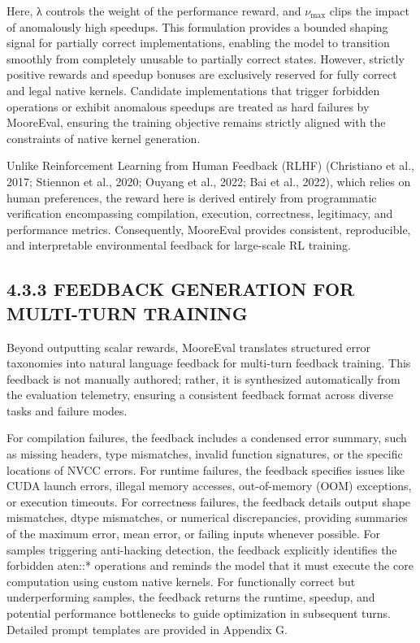 \documentclass[
  10
]{article}
\begin{document}
Here, λ controls the weight of the performance reward, and
\(\nu _ { \mathrm { m a x } }\) clips the impact of anomalously high
speedups. This formulation provides a bounded shaping signal for
partially correct implementations, enabling the model to transition
smoothly from completely unusable to partially correct states. However,
strictly positive rewards and speedup bonuses are exclusively reserved
for fully correct and legal native kernels. Candidate implementations
that trigger forbidden operations or exhibit anomalous speedups are
treated as hard failures by MooreEval, ensuring the training objective
remains strictly aligned with the constraints of native kernel
generation.

Unlike Reinforcement Learning from Human Feedback (RLHF) (Christiano et
al., 2017; Stiennon et al., 2020; Ouyang et al., 2022; Bai et al.,
2022), which relies on human preferences, the reward here is derived
entirely from programmatic verification encompassing compilation,
execution, correctness, legitimacy, and performance metrics.
Consequently, MooreEval provides consistent, reproducible, and
interpretable environmental feedback for large-scale RL training.

\subsection{4.3.3 FEEDBACK GENERATION FOR MULTI-TURN
TRAINING}\label{feedback-generation-for-multi-turn-training}

Beyond outputting scalar rewards, MooreEval translates structured error
taxonomies into natural language feedback for multi-turn feedback
training. This feedback is not manually authored; rather, it is
synthesized automatically from the evaluation telemetry, ensuring a
consistent feedback format across diverse tasks and failure modes.

For compilation failures, the feedback includes a condensed error
summary, such as missing headers, type mismatches, invalid function
signatures, or the specific locations of NVCC errors. For runtime
failures, the feedback specifies issues like CUDA launch errors, illegal
memory accesses, out-of-memory (OOM) exceptions, or execution timeouts.
For correctness failures, the feedback details output shape mismatches,
dtype mismatches, or numerical discrepancies, providing summaries of the
maximum error, mean error, or failing inputs whenever possible. For
samples triggering anti-hacking detection, the feedback explicitly
identifies the forbidden aten::* operations and reminds the model that
it must execute the core computation using custom native kernels. For
functionally correct but underperforming samples, the feedback returns
the runtime, speedup, and potential performance bottlenecks to guide
optimization in subsequent turns. Detailed prompt templates are provided
in Appendix G.
\end{document}
